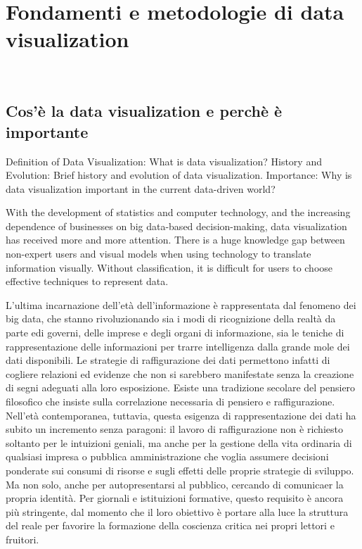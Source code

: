 \chapter{Fondamenti e metodologie di data visualization}
\label{cap:studio}
\\

\section{Cos'è la data visualization e perchè è importante}
Definition of Data Visualization: What is data visualization?
History and Evolution: Brief history and evolution of data visualization.
Importance: Why is data visualization important in the current data-driven world?



With the development of statistics and
computer technology, and the increasing dependence
of businesses on big data-based decision-making,
data visualization has received more and more
attention.
There is a huge knowledge gap between non-expert
users and visual models when using technology to
translate information visually. Without classification,
it is difficult for users to choose effective techniques
to represent data.

L'ultima incarnazione dell'età dell'informazione è rappresentata dal fenomeno dei big data,
che stanno rivoluzionando sia i modi di ricognizione della realtà da parte edi governi, delle imprese e 
degli organi di informazione, sia le teniche di rappresentazione delle informazioni per trarre 
intelligenza dalla grande mole dei dati disponibili. Le strategie di raffigurazione dei dati permettono infatti
di cogliere relazioni ed evidenze che non si sarebbero manifestate senza la creazione di segni adeguati alla loro esposizione.
Esiste una tradizione secolare del pensiero filosofico che insiste sulla correlazione necessaria di pensiero 
e raffigurazione. Nell'età contemporanea, tuttavia, questa esigenza di rappresentazione dei dati
ha subito un incremento senza paragoni: il lavoro di raffigurazione non è richiesto soltanto per le intuizioni geniali, ma anche
per la gestione della vita ordinaria di qualsiasi impresa o pubblica amministrazione che voglia assumere decisioni ponderate
sui consumi di risorse e sugli effetti delle proprie strategie di sviluppo. Ma non solo, anche per autopresentarsi 
al pubblico, cercando di comunicaer la propria identità.
Per giornali e istituizioni formative, questo requisito è ancora più stringente, dal momento che il loro obiettivo è portare alla 
luce la struttura del reale per favorire la formazione della coscienza critica nei propri lettori e fruitori.

